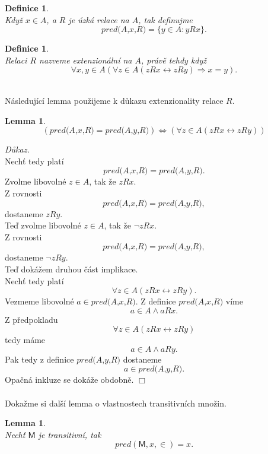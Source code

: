 \documentclass[12pt,a4paper]{article}
\newtheorem{lemma}[veta]{Lemma}
\newtheorem{definice}[veta]{Definice}
\newenvironment{proof}
{\noindent \textit{D\r{u}kaz.}}
{\hspace*{\fill} $\Box$}
\begin{document}
\begin{definice}~\\
\label{def:pred}
Kdy\v{z} $ x \in A $, a $ R $ je \'{u}zk\'{a} relace na $ A $, tak definujme \[ \textit{pred(A,x,R)}=\{y \in A: yRx\} .\]
\end{definice}

\begin{definice}
~\\
Relaci $ R $ nazveme extenzion\'{a}ln\'{i} na $ A $, pr\'{a}v\v{e} tehdy kdy\v{z} 
\[  \forall x,y \in A(\forall z \in A (zRx \leftrightarrow zRy) \Rightarrow x=y ) .\]
\end{definice}~\\
N\'{a}sleduj\'{i}c\'{i} lemma pou\v{z}ijeme k d\r{u}kazu extenzionality relace $ R $.~\\
\begin{lemma}
\label{lem:exten}
\[ (\textit{pred(A,x,R)} =  \textit{pred(A,y,R)}) \Leftrightarrow  (\forall z \in A (zRx \leftrightarrow zRy)) \]
\end{lemma}
\begin{proof}~\\
Nech\v{t} tedy plat\'{i} \[ \textit{pred(A,x,R)} =  \textit{pred(A,y,R)} .\]
Zvolme libovoln\'{e} $ z \in A $, tak \v{z}e $ zRx $. \\
Z rovnosti  \[ \textit{pred(A,x,R)} =  \textit{pred(A,y,R)} ,\] dostaneme $  zRy $.  \\
Te\v{d} zvolme libovoln\'{e} $ z \in A $, tak \v{z}e $ \neg zRx $. \\
Z rovnosti  \[ \textit{pred(A,x,R)} =  \textit{pred(A,y,R)} ,\] dostaneme $\neg  zRy$.\\
Te\v{d} dok\'{a}\v{z}em druhou \v{c}\'{a}st implikace. \\
Nech\v{t} tedy plat\'{i} \[ \forall z \in A (zRx \leftrightarrow zRy) .\]
Vezmeme libovoln\'{e} $ a \in \textit{pred(A,x,R)}$. Z definice $\textit{pred(A,x,R)} $ v\'{i}me  \[ a \in A \wedge aRx .\]
Z p\v{r}edpokladu \[ \forall z \in A (zRx \leftrightarrow zRy) \] tedy m\'{a}me 
\[ a \in A \wedge aRy .\] 
Pak tedy z definice $\textit{pred(A,y,R)}$ dostaneme 
\[ a \in \textit{pred(A,y,R)} . \]
Opa\v{c}n\'{a} inkluze se dok\'{a}\v{z}e obdobn\v{e}.
\end{proof}~\\~\\
Doka\v{z}me si dal\v{s}\'{i} lemma o vlastnostech transitivn\'{i}ch mno\v{z}in.
\begin{lemma} 
\label{lem:pred}
~\\
Nech\v{t} $ \textsf{M} $ je transitivn\'{i}, tak 
\[  \mathit{pred(\mathsf{M},x,\in)} = x .\]
\end{lemma}
\end{document}
